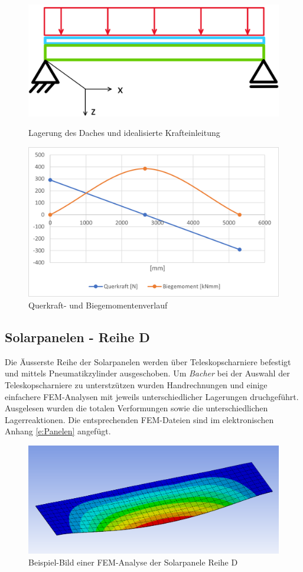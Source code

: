 \begin{figure}[h]
\centering
\begin{minipage}{.4\textwidth}
  \centering
  \includegraphics[width=.98\linewidth]{04_figures/Dach Idealisierung.png}
  \caption{Lagerung des Daches und idealisierte Krafteinleitung}
  \label{Dach Idealisierung}
\end{minipage}%
\begin{minipage}{.6\textwidth}
  \centering
  \includegraphics[width=.98\linewidth]{04_figures/Dach QM.png}
  \caption{Querkraft- und Biegemomentenverlauf}
  \label{Dach QM}
\end{minipage}
\end{figure}


\subsection{Solarpanelen - Reihe D}
Die Äusserste Reihe der Solarpanelen werden über Teleskopscharniere befestigt und mittels Pneumatikzylinder ausgeschoben. Um \emph{Bacher} bei der Auswahl der Teleskopscharniere zu unterstzützen wurden Handrechnungen und einige einfachere FEM-Analysen mit jeweils unterschiedlicher Lagerungen druchgeführt. Ausgelesen wurden die totalen Verformungen sowie die unterschiedlichen Lagerreaktionen. Die entsprechenden FEM-Dateien sind im elektronischen Anhang \ref{e:Panelen} angefügt.

\begin{figure}[h]
  \centering
  \includegraphics[width=.6\linewidth]{04_figures/Panelen Verformung.png}
  \caption{Beispiel-Bild einer FEM-Analyse der Solarpanele Reihe D}
  \label{Panelen Verformung}
\end{figure}
\newpage
